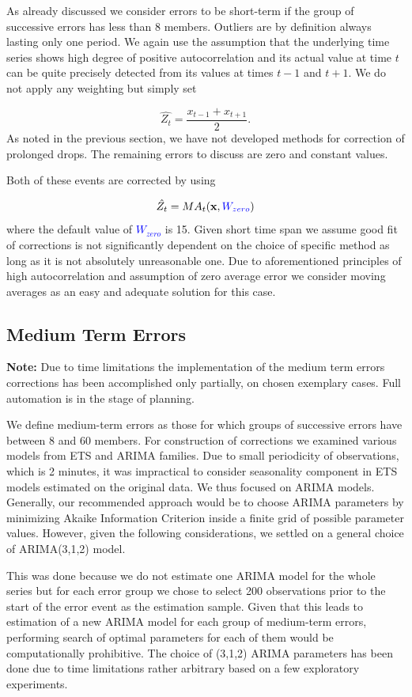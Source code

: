 \documentclass[12pt,a4paper]{article}
\begin{document}
As already discussed we consider errors to be short-term if the group of successive errors has less than 8 members.
Outliers are by definition always lasting only one period. We again use the assumption that the underlying time series shows high degree of positive autocorrelation and its actual value at time $t$ can be quite precisely detected from its values at times $t-1$ and $t+1$. We do not apply any weighting but simply set

$$\hat{Z_t} = \dfrac{x_{t-1} + x_{t+1}}{2}.$$
As noted in the previous section, we have not developed methods for correction of prolonged drops. The remaining errors to discuss are zero and constant values. 

Both of these events are corrected by using

$$\hat{Z_t} = MA_t(\mathbf{x}, \textcolor{blue}{W_{zero}})$$
where the default value of \textcolor{blue}{$W_{zero}$} is 15. Given short time span we assume good fit of corrections is not significantly dependent on the choice of specific method as long as it is not absolutely unreasonable one. Due to aforementioned principles of high autocorrelation and assumption of zero average error we consider moving averages as an easy and adequate solution for this case.


\subsection{Medium Term Errors}
\textbf{Note:} Due to time limitations the implementation of the medium term errors corrections has been accomplished only partially, on chosen exemplary cases. Full automation is in the stage of planning.

We define medium-term errors as those for which groups of successive errors have between 8 and 60 members. For construction of corrections we examined various models from ETS and ARIMA families. Due to small periodicity of observations, which is 2 minutes, it was impractical to consider seasonality component in ETS models estimated on the original data. We thus focused on ARIMA models. Generally, our  recommended approach would be to choose ARIMA parameters by minimizing Akaike Information Criterion inside a finite grid of possible parameter values. However, given the following considerations, we settled on a general choice of ARIMA(3,1,2) model.

This was done because we do not estimate one ARIMA model for the whole series but for each error group we chose to select 200 observations prior to the start of the error event  as the estimation sample.  Given that this leads to estimation of a new ARIMA model  for each group of medium-term errors, performing search of optimal parameters for each of them would be computationally prohibitive. The choice of (3,1,2) ARIMA parameters has been done due to time limitations rather arbitrary based on a few exploratory experiments.
\end{document}
